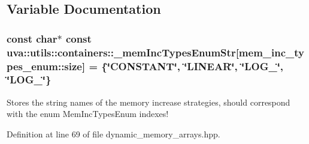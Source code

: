 \subsection{Variable Documentation}
\hypertarget{namespaceuva_1_1utils_1_1containers_af8fa681c6894f17bfa25c736eb3d8ce8}{}
\subsubsection[{\+\_\+mem\+Inc\+Types\+Enum\+Str}]{\setlength{\rightskip}{0pt plus 5cm}const char$\ast$ const uva\+::utils\+::containers\+::\+\_\+mem\+Inc\+Types\+Enum\+Str\mbox{[}mem\+\_\+inc\+\_\+types\+\_\+enum\+::size\mbox{]} = \{\char`\"{}C\+O\+N\+S\+T\+A\+N\+T\char`\"{}, \char`\"{}{\bf L\+I\+N\+E\+A\+R}\char`\"{}, \char`\"{}{\bf L\+O\+G\+\_}\char`\"{}, \char`\"{}{\bf L\+O\+G\+\_}\char`\"{}\}}\label{namespaceuva_1_1utils_1_1containers_af8fa681c6894f17bfa25c736eb3d8ce8}
Stores the string names of the memory increase strategies, should correspond with the enum Mem\+Inc\+Types\+Enum indexes! 

Definition at line 69 of file dynamic\+\_\+memory\+\_\+arrays.\+hpp.

